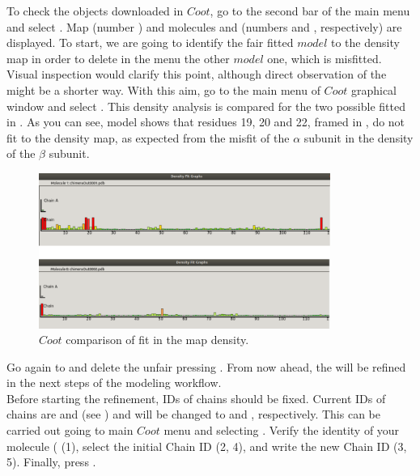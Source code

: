 \begin{itemize}
  To check the objects downloaded in $Coot$, go to the second bar of the main menu and select . Map  (number ) and molecules  and  (numbers  and , respectively) are displayed. To start, we are going to identify the fair fitted $model$ to the density map in order to delete in the  menu the other $model$ one, which is misfitted. Visual inspection would clarify this point, although direct observation of the  might be a shorter way. With this aim, go to the main menu of $Coot$ graphical window and select . This density analysis is compared for the two possible fitted  in . As you can see, model  shows that residues 19, 20 and 22, framed in , do not fit to the density map, as expected from the misfit of the $\alpha$ subunit in the density of the $\beta$ subunit.
 
 \begin{figure}[H]
  \centering 
  \captionsetup{width=.7\linewidth} 
  \includegraphics[width=0.85\textwidth]{Images/Fig25}
  \caption{$Coot$ comparison of  fit in the map density.}
  \label{fig:coot_density_fit_analysis}
  \end{figure}
  
  Go again to  and delete the unfair   pressing . From now ahead, the   will be refined in the next steps of the modeling workflow.\\
  
  Before starting the refinement, IDs of chains should be fixed. Current IDs of chains are  and  (see ) and will be changed to  and , respectively. This can be carried out going to main $Coot$ menu and selecting . Verify the identity of your  molecule ( (1), select the initial Chain ID (2, 4), and write the new Chain ID (3, 5). Finally, press .
 

\end{itemize}
